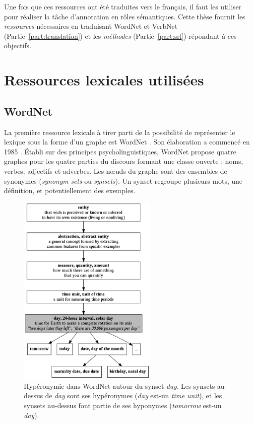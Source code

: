 Une fois que ces ressources ont été traduites vers le français, il faut les
utiliser pour réaliser la tâche d'annotation en rôles sémantiques. Cette thèse
fournit les \emph{ressources} nécessaires en traduisant WordNet et VerbNet
(Partie~\ref{part:translation}) et les \emph{méthodes} (Partie~\ref{part:srl})
répondant à ces objectifs.

\section{Ressources lexicales utilisées}
\label{ressources_utilisees}

\subsection{WordNet}
\label{presentation_wordnet}

La première ressource lexicale à tirer parti de la possibilité de représenter
le lexique sous la forme d'un graphe est WordNet \citep{fellbaum1998wordnet}.
Son élaboration a commencé en 1985 \citep{miller1990introduction}. Établi sur
des principes psycholinguistiques, WordNet propose quatre graphes pour les
quatre parties du discours formant une classe ouverte : noms, verbes,
adjectifs et adverbes. Les nœuds du graphe sont des ensembles de synonymes
(\emph{synonym sets} ou \emph{synsets}). Un synset regroupe plusieurs mots, une
définition, et potentiellement des exemples.

\begin{figure}
    \centering
    \includegraphics[width=0.6\textwidth]{fig/wordnet_hypernymy.png}
    \caption{\label{fig:wordnet_hypernymy}Hypéronymie dans WordNet autour du
        synset \emph{day}. Les synsets au-dessus de \emph{day} sont ses hypéronymes
        (\emph{day} est-un \emph{time unit}), et les synsets au-dessus font partie de
        ses hyponymes (\emph{tomorrow} est-un \emph{day}).}
\end{figure}

